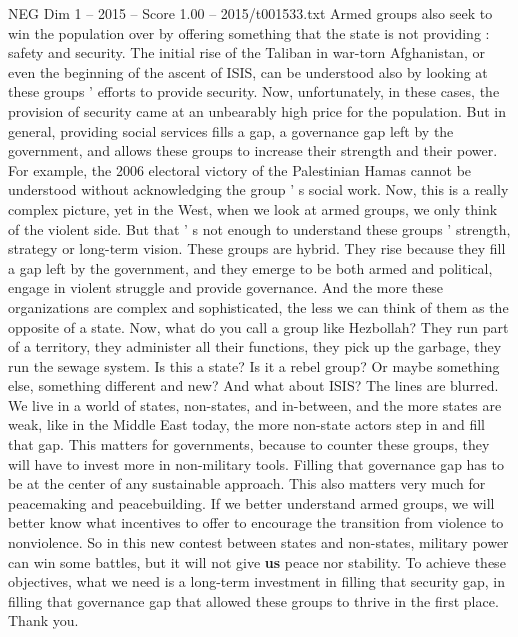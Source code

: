 \begin{textsample}{NEG Dim 1 – 2015 – Score 1.00 – 2015/t001533.txt}
Armed groups also seek to win the population over by offering something that the state is not providing : safety and security.
The initial rise of the Taliban in war-torn Afghanistan, or even the beginning of the ascent of ISIS, can be understood also by looking at these groups ' efforts to provide security.
Now, unfortunately, in these cases, the provision of security came at an unbearably high price for the population.
But in general, providing social services fills a gap, a governance gap left by the government, and allows these groups to increase their strength and their power.
For example, the 2006 electoral victory of the Palestinian Hamas cannot be understood without acknowledging the group ' s social work.
Now, this is a really complex picture, yet in the West, when we look at armed groups, we only think of the violent side.
But that ' s not enough to understand these groups ' strength, strategy or long-term vision.
These groups are hybrid.
They rise because they fill a gap left by the government, and they emerge to be both armed and political, engage in violent struggle and provide governance.
And the more these organizations are complex and sophisticated, the less we can think of them as the opposite of a state.
Now, what do you call a group like Hezbollah?
They run part of a territory, they administer all their functions, they pick up the garbage, they run the sewage system.
Is this a state?
Is it a rebel group?
Or maybe something else, something different and new?
And what about ISIS?
The lines are blurred.
We live in a world of states, non-states, and in-between, and the more states are weak, like in the Middle East today, the more non-state actors step in and fill that gap.
This matters for governments, because to counter these groups, they will have to invest more in non-military tools.
Filling that governance gap has to be at the center of any sustainable approach.
This also matters very much for peacemaking and peacebuilding.
If we better understand armed groups, we will better know what incentives to offer to encourage the transition from violence to nonviolence.
So in this new contest between states and non-states, military power can win some battles, but it will not give \textbf{us} peace nor stability.
To achieve these objectives, what we need is a long-term investment in filling that security gap, in filling that governance gap that allowed these groups to thrive in the first place.
Thank you.

\end{textsample}
